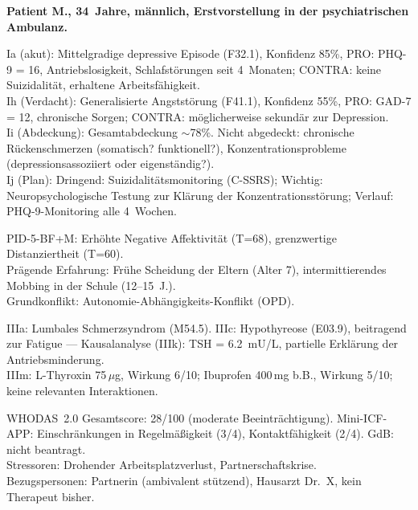 \documentclass[11pt,a4paper]{article}
\begin{document}
\vspace{0.5em}
\noindent \textbf{Patient M., 34~Jahre, m\"annlich, Erstvorstellung in der psychiatrischen Ambulanz.}

\begin{description}[style=nextline, leftmargin=1.5cm, font=\bfseries\small]
\item[Achse~I (Psychische Profile)]
Ia (akut): Mittelgradige depressive Episode (F32.1), Konfidenz 85\%, PRO: PHQ-9 = 16, Antriebslosigkeit, Schlafst\"orungen seit 4~Monaten; CONTRA: keine Suizidalit\"at, erhaltene Arbeitsfähigkeit. \\
Ih (Verdacht): Generalisierte Angstst\"orung (F41.1), Konfidenz 55\%, PRO: GAD-7 = 12, chronische Sorgen; CONTRA: m\"oglicherweise sekund\"ar zur Depression. \\
Ii (Abdeckung): Gesamtabdeckung $\sim$78\%. Nicht abgedeckt: chronische R\"uckenschmerzen (somatisch? funktionell?), Konzentrationsprobleme (depressionsassoziiert oder eigenst\"andig?). \\
Ij (Plan): Dringend: Suizidalit\"atsmonitoring (C-SSRS); Wichtig: Neuropsychologische Testung zur Kl\"arung der Konzentrationsst\"orung; Verlauf: PHQ-9-Monitoring alle 4~Wochen.
\item[Achse~II (Biographie)]
PID-5-BF+M: Erh\"ohte Negative Affektivit\"at (T=68), grenzwertige Distanziertheit (T=60). \\
Pr\"agende Erfahrung: Fr\"uhe Scheidung der Eltern (Alter 7), intermittierendes Mobbing in der Schule (12--15~J.). \\
Grundkonflikt: Autonomie-Abh\"angigkeits-Konflikt (OPD).
\item[Achse~III (Med. Synopse)]
IIIa: Lumbales Schmerzsyndrom (M54.5). IIIc: Hypothyreose (E03.9), beitragend zur Fatigue --- Kausalanalyse (IIIk): TSH = 6.2~mU/L, partielle Erkl\"arung der Antriebsminderung. \\
IIIm: L-Thyroxin 75\,$\mu$g, Wirkung 6/10; Ibuprofen 400\,mg b.B., Wirkung 5/10; keine relevanten Interaktionen.
\item[Achse~IV (Umwelt \& Funktion)]
WHODAS~2.0 Gesamtscore: 28/100 (moderate Beeintr\"achtigung). Mini-ICF-APP: Einschr\"ankungen in Regelm\"a\ss{}igkeit (3/4), Kontaktf\"ahigkeit (2/4). GdB: nicht beantragt. \\
Stressoren: Drohender Arbeitsplatzverlust, Partnerschaftskrise. \\
Bezugspersonen: Partnerin (ambivalent st\"utzend), Hausarzt Dr.~X, kein Therapeut bisher.
\item[Achse~V (Bedingungsmodell)]

\end{description}
\end{document}
